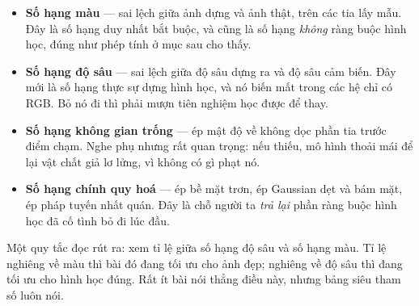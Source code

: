 \documentclass[../../deep_learning.tex]{subfiles}
\begin{document}
\begin{itemize}
\item \textbf{Số hạng màu} --- sai lệch giữa ảnh dựng và ảnh thật, trên các tia lấy mẫu. Đây là số hạng duy nhất bắt buộc, và cũng là số hạng \emph{không} ràng buộc hình học, đúng như phép tính ở mục sau cho thấy.
\item \textbf{Số hạng độ sâu} --- sai lệch giữa độ sâu dựng ra và độ sâu cảm biến. Đây mới là số hạng thực sự dựng hình học, và nó biến mất trong các hệ chỉ có RGB. Bỏ nó đi thì phải mượn tiên nghiệm học được để thay.
\item \textbf{Số hạng không gian trống} --- ép mật độ về không dọc phần tia trước điểm chạm. Nghe phụ nhưng rất quan trọng: nếu thiếu, mô hình thoải mái để lại vật chất giả lơ lửng, vì không có gì phạt nó.
\item \textbf{Số hạng chính quy hoá} --- ép bề mặt trơn, ép Gaussian dẹt và bám mặt, ép pháp tuyến nhất quán. Đây là chỗ người ta \emph{trả lại} phần ràng buộc hình học đã cố tình bỏ đi lúc đầu.
\end{itemize}

Một quy tắc đọc rút ra: xem tỉ lệ giữa số hạng độ sâu và số hạng màu. Tỉ lệ nghiêng về màu thì bài đó đang tối ưu cho ảnh đẹp; nghiêng về độ sâu thì đang tối ưu cho hình học đúng. Rất ít bài nói thẳng điều này, nhưng bảng siêu tham số luôn nói.
\end{document}
